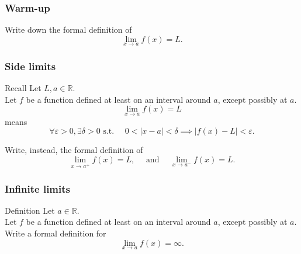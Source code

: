 \documentclass[14pt]{beamer}
\begin{document}
	\begin{frame}
		\frametitle{Warm-up}

		Write down the formal definition of
		\[
			\lim_{x \to a}f(x) = L.
		\]
	\end{frame}


	\begin{frame}
		\frametitle{Side limits}

		\begin{block}{Recall}
			Let $L, a \in \mathbb{R}$. \\ Let $f$ be a function defined at least on an
			interval around $a$, except possibly at $a$. \\
			\[
				\lim_{x \to a}f(x) = L
			\]
			means
			\[
				\forall \varepsilon >0, \exists \delta >0 \text{ s.t. }\quad 0<|x-a|<\delta
				\implies |f(x)-L| < \varepsilon.
			\]
		\end{block}

		\vfill

		Write, instead, the formal definition of
		\[
			\lim_{x \to a^+}f(x) = L, \quad \text{ and }\quad \lim_{x \to a^-}f(x) = L.
		\]
	\end{frame}

	\begin{frame}
		\frametitle{Infinite limits}

		\begin{block}{Definition}
			Let $a \in \mathbb{R}$. \\ Let $f$ be a function defined at least on an
			interval around $a$, except possibly at $a$. \\ Write a formal definition
			for
			\[
				\lim_{x \to a}f(x) = \infty.
			\]
		\end{block}
	\end{frame}
\end{document}
